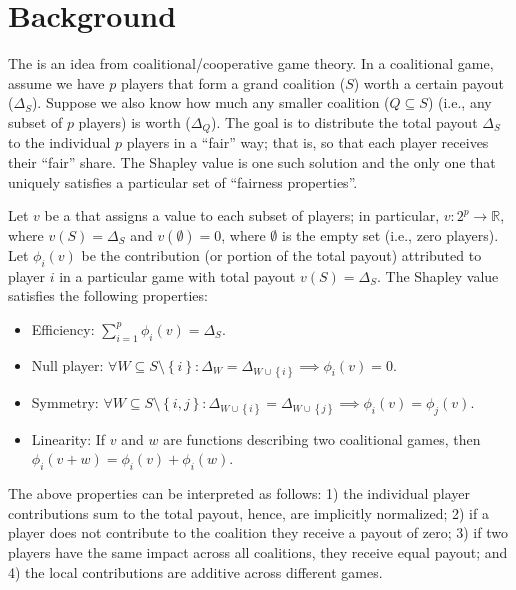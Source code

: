 \section{Background}

The  \citep{shapley-2016-value} is an idea from
coalitional/cooperative game theory. In a coalitional game, assume we
have \(p\) players that form a grand coalition (\(S\)) worth a certain
payout (\(\Delta_S\)). Suppose we also know how much any smaller
coalition (\(Q \subseteq S\)) (i.e., any subset of \(p\) players) is
worth (\(\Delta_Q\)). The goal is to distribute the total payout
\(\Delta_S\) to the individual \(p\) players in a ``fair'' way; that is,
so that each player receives their ``fair'' share. The Shapley value is
one such solution and the only one that uniquely satisfies a particular
set of ``fairness properties''.

Let \(v\) be a  that assigns a value to
each subset of players; in particular,
\(v : 2^p \rightarrow \mathbb{R}\), where \(v\left(S\right) = \Delta_S\)
and \(v\left(\emptyset\right) = 0\), where \(\emptyset\) is the empty
set (i.e., zero players). Let \(\phi_i\left(v\right)\) be the
contribution (or portion of the total payout) attributed to player \(i\)
in a particular game with total payout \(v\left(S\right) = \Delta_S\).
The Shapley value satisfies the following properties:

\begin{itemize}

  \item Efficiency: $\sum_{i = 1} ^ p \phi_i\left(v\right) = \Delta_S $.
  
  \item Null player: $\forall W \subseteq S \setminus \left\{i\right\}: \Delta_W = \Delta_{W \cup \left\{i\right\}} \implies \phi_i\left(v\right) = 0$.
  
  \item Symmetry: $\forall W \subseteq S \setminus \left\{i, j\right\}: \Delta_{W \cup \left\{i\right\}} = \Delta_{W \cup \left\{j\right\}} \implies \phi_i\left(v\right) = \phi_j\left(v\right)$.
  
  \item Linearity: If $v$ and $w$ are functions describing two coalitional games, then $\phi_i\left(v + w\right) = \phi_i\left(v\right) + \phi_i\left(w\right)$.

\end{itemize}

The above properties can be interpreted as follows: 1) the individual
player contributions sum to the total payout, hence, are implicitly
normalized; 2) if a player does not contribute to the coalition they
receive a payout of zero; 3) if two players have the same impact across
all coalitions, they receive equal payout; and 4) the local
contributions are additive across different games.

